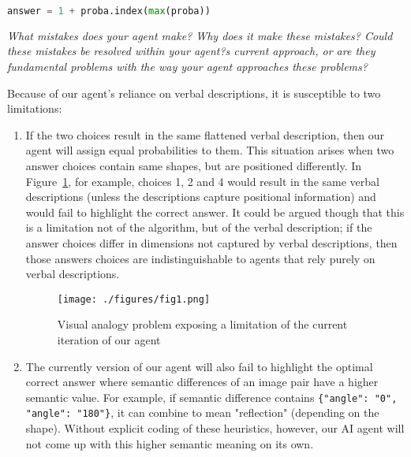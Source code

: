 \documentclass[10pt,letterpaper]{article}
\newcommand{\mypar}{\par{\vspace{0.2cm}}}
\newcommand{\rubric}[1]{\mypar{}\textcolor{mygray}{\emph{#1}}\mypar{}}
\begin{document}
\begin{small}
\begin{lstlisting}[language=python]
answer = 1 + proba.index(max(proba)) 
\end{lstlisting}
\end{small}
\rubric{What mistakes does your agent make? Why does it make these mistakes? Could these mistakes be resolved within your agent?s current approach, or are they fundamental problems with the way your agent approaches these problems?}

Because of our agent's reliance on verbal descriptions, it is susceptible to two limitations:

\begin{enumerate}
\item If the two choices result in the same flattened verbal description, then our agent will assign equal probabilities to them. This situation arises when two answer choices contain same shapes, but are positioned differently. In Figure~\ref{fig1}, for example, choices 1, 2 and 4 would result in the same verbal descriptions (unless the descriptions capture positional information) and would fail to highlight the correct answer. It could be argued though that this is a limitation not of the algorithm, but of the verbal description; if the answer choices differ in dimensions not captured by verbal descriptions, then those answers choices are indistinguishable to agents that rely purely on verbal descriptions.

\begin{figure}
\centering
\texttt{[image: ./figures/fig1.png]}
\caption{Visual analogy problem exposing a limitation of the current iteration of our agent\label{fig1}}
\end{figure}

\item The currently version of our agent will also fail to highlight the optimal correct answer where semantic differences of an image pair have a higher semantic value. For example, if semantic difference contains {\small \tt\{"angle": "0", "angle": "180"\}}, it can combine to mean "reflection" (depending on the shape). Without explicit coding of these heuristics, however, our AI agent will not come up with this higher semantic meaning on its own.
\end{enumerate}
\end{document}
